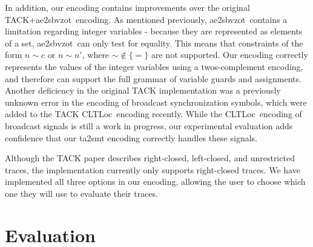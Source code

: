 \documentclass[a4paper,11pt]{report}
\theoremstyle{definition}
\newcommand{\cltloc}{CLTLoc}
\newcommand{\aez}{ae2sbvzot}
\begin{document}
In addition, our encoding contains improvements over the original TACK+\aez\
encoding. As mentioned previously, \aez\ contains a limitation regarding integer
variables - because they are represented as elements of a set, \aez\ can only
test for equality. This means that constraints of the form $n \sim c$ or
$n \sim n'$, where $\sim \not\in \{=\}$ are not supported. Our encoding correctly
represents the values of the integer variables using a twos-complement encoding,
and therefore can support the full grammar of variable guards and assignments.
Another deficiency in the original TACK implementation was a previously unknown
error in the encoding of broadcast synchronization symbols, which were added to
the TACK \cltloc\ encoding recently. While the \cltloc\ encoding of broadcast
signals is still a work in progress, our experimental evaluation adds confidence
that our ta2smt encoding correctly handles these signals.


Although the TACK paper describes right-closed, left-closed, and unrestricted
traces, the implementation currently only supports right-closed traces. We have
implemented all three options in our encoding, allowing the user to choose which
one they will use to evaluate their traces.

\chapter{Evaluation}\label{evaluation}
\end{document}
